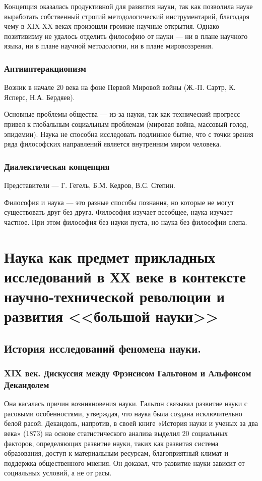 Концепция оказалась продуктивной для развития науки, так как позволила науке выработать собственный строгий методологический инструментарий, благодаря чему в XIX-XX веках произошли громкие научные открытия. 
Однако позитивизму не удалось отделить философию от науки --- ни в плане научного языка, ни в плане научной методологии, ни в плане мировоззрения. 

\subsubsection{Антиинтеракционизм}

Возник в начале 20 века на фоне Первой Мировой войны (Ж.-П. Сартр, К. Ясперс, Н.А. Бердяев). 

Основные проблемы общества --- из-за науки, так как технический прогресс привел к глобальным социальным проблемам (мировая война, массовый голод, эпидемии).
Наука не способна исследовать подлинное бытие, что с точки зрения ряда философских направлений является внутренним миром человека.

\subsubsection{Диалектическая концепция}

Представители --- Г. Гегель, Б.М. Кедров, В.С. Степин.

Философия и наука --- это разные способы познания, но которые не могут существовать друг без друга. Философия изучает всеобщее, наука изучает частное. При этом философия без науки пуста, но наука без философии слепа.


\section {Наука как предмет прикладных исследований в ХХ веке в контексте научно-технической революции и развития <<большой науки>>}

\subsection{История исследований феномена науки.}

\subsubsection{XIX век. Дискуссия между Фрэнсисом Гальтоном и Альфонсом Декандолем}

Она касалась причин возникновения науки. Гальтон связывал развитие науки с расовыми особенностями, утверждая, что наука была создана исключительно белой расой. Декандоль, напротив, в своей книге «История науки и ученых за два века» (1873) на основе статистического анализа выделил 20 социальных факторов, определяющих развитие науки, таких как развитая система образования, доступ к материальным ресурсам, благоприятный климат и поддержка общественного мнения. Он доказал, что развитие науки зависит от социальных условий, а не от расы.

